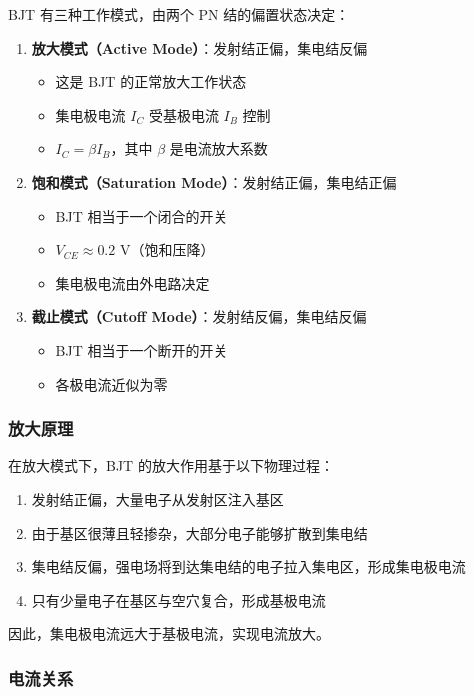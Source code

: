 BJT 有三种工作模式，由两个 PN 结的偏置状态决定：

\begin{enumerate}
  \item \textbf{放大模式（Active Mode）}：发射结正偏，集电结反偏
    \begin{itemize}
      \item 这是 BJT 的正常放大工作状态
      \item 集电极电流 $I_C$ 受基极电流 $I_B$ 控制
      \item $I_C = \beta I_B$，其中 $\beta$ 是电流放大系数
    \end{itemize}

  \item \textbf{饱和模式（Saturation Mode）}：发射结正偏，集电结正偏
    \begin{itemize}
      \item BJT 相当于一个闭合的开关
      \item $V_{CE} \approx 0.2$ V（饱和压降）
      \item 集电极电流由外电路决定
    \end{itemize}

  \item \textbf{截止模式（Cutoff Mode）}：发射结反偏，集电结反偏
    \begin{itemize}
      \item BJT 相当于一个断开的开关
      \item 各极电流近似为零
    \end{itemize}
\end{enumerate}

\subsubsection{放大原理}

在放大模式下，BJT 的放大作用基于以下物理过程：

\begin{enumerate}
  \item 发射结正偏，大量电子从发射区注入基区
  \item 由于基区很薄且轻掺杂，大部分电子能够扩散到集电结
  \item 集电结反偏，强电场将到达集电结的电子拉入集电区，形成集电极电流
  \item 只有少量电子在基区与空穴复合，形成基极电流
\end{enumerate}

因此，集电极电流远大于基极电流，实现电流放大。

\subsubsection{电流关系}

